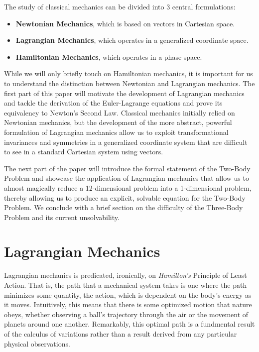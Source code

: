 \documentclass[10pt, psamsfonts]{amsart}
\theoremstyle{definition}
\theoremstyle{remark}
\numberwithin{equation}{section}
\begin{document}
The study of classical mechanics can be divided into 3 central formulations:
\begin{itemize}
  \item[] \textbf{Newtonian Mechanics}, which is based on vectors in Cartesian space.
  \item[] \textbf{Lagrangian Mechanics}, which operates in a generalized coordinate space.
  \item[] \textbf{Hamiltonian Mechanics}, which operates in a phase space.
\end{itemize}
While we will only briefly touch on Hamiltonian mechanics, it is important for us to understand the distinction between Newtonian and Lagrangian mechanics. The first part of this paper will motivate the development of Lagrangian mechanics and tackle the derivation of the Euler-Lagrange equations and prove its equivalency to Newton's Second Law. Classical mechanics initially relied on Newtonian mechanics, but the development of the more abstract, powerful formulation of Lagrangian mechanics allow us to exploit transformational invariances and symmetries in a generalized coordinate system that are difficult to see in a standard Cartesian system using vectors.

The next part of the paper will introduce the formal statement of the Two-Body Problem and showcase the application of Lagrangian mechanics that allow us to almost magically reduce a 12-dimensional problem into a 1-dimensional problem, thereby allowing us to produce an explicit, solvable equation for the Two-Body Problem. We conclude with a brief section on the difficulty of the Three-Body Problem and its current unsolvability.

\section{Lagrangian Mechanics}
Lagrangian mechanics is predicated, ironically, on \textit{Hamilton's} Principle of Least Action. That is, the path that a mechanical system takes is one where the path minimizes some quantity, the action, which is dependent on the body's energy as it moves. Intuitively, this means that there is some optimized motion that nature obeys, whether observing a ball's trajectory through the air or the movement of planets around one another. Remarkably, this optimal path is a fundmental result of the calculus of variations rather than a result derived from any particular physical observations.
\end{document}
